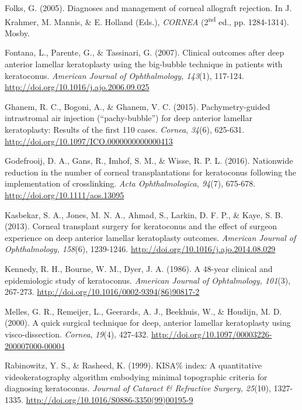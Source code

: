 \documentclass[authordate, empirical,issue]{jote-new-article}
\begin{document}
	Folks, G. (2005). Diagnoses and management of corneal allograft rejection. In J. Krahmer, M. Mannis, \& E. Holland (Eds.), \emph{CORNEA }(2\textsuperscript{nd} ed., pp. 1284-1314). Mosby.



	Fontana, L., Parente, G., \& Tassinari, G. (2007). Clinical outcomes after deep anterior lamellar keratoplasty using the big-bubble technique in patients with keratoconus. \emph{American Journal of Ophthalmology, 143}(1), 117-124. \url{http://doi.org/10.1016/j.ajo.2006.09.025}



	Ghanem, R. C., Bogoni, A., \& Ghanem, V. C. (2015). Pachymetry-guided intrastromal air injection (“pachy-bubble”) for deep anterior lamellar keratoplasty: Results of the first 110 cases. \emph{Cornea}, \emph{34}(6), 625-631. \url{http://doi.org/10.1097/ICO.0000000000000413}



	Godefrooij, D. A., Gans, R., Imhof, S. M., \& Wisse, R. P. L. (2016). Nationwide reduction in the number of corneal transplantations for keratoconus following the implementation of crosslinking. \emph{Acta Ophthalmologica, 94}(7), 675-678. \url{http://doi.org/10.1111/aos.13095}



	Kasbekar, S. A., Jones, M. N. A., Ahmad, S., Larkin, D. F. P., \& Kaye, S. B. (2013). Corneal transplant surgery for keratoconus and the effect of surgeon experience on deep anterior lamellar keratoplasty outcomes. \emph{American Journal of Ophthalmology, 158}(6), 1239-1246. \url{http://doi.org/10.1016/j.ajo.2014.08.029}



	Kennedy, R. H., Bourne, W. M., Dyer, J. A. (1986). A 48-year clinical and epidemiologic study of keratoconus. \emph{American Journal of Ophtalmology, 101}(3), 267-273. \url{http://doi.org/10.1016/0002-9394(86)90817-2}



	Melles, G. R., Remeijer, L., Geerards, A. J., Beekhuis, W., \& Houdijn, M. D. (2000). A quick surgical technique for deep, anterior lamellar keratoplasty using visco-dissection. \emph{Cornea}, \emph{19}(4), 427-432. \url{http://doi.org/10.1097/00003226-200007000-00004}



	Rabinowitz, Y. S., \& Rasheed, K. (1999). KISA\% index: A quantitative videokeratography algorithm embodying minimal topographic criteria for diagnosing keratoconus. \emph{Journal of Cataract \& Refractive Surgery, 25}(10), 1327-1335. \url{http://doi.org/10.1016/S0886-3350(99)00195-9}
\end{document}
